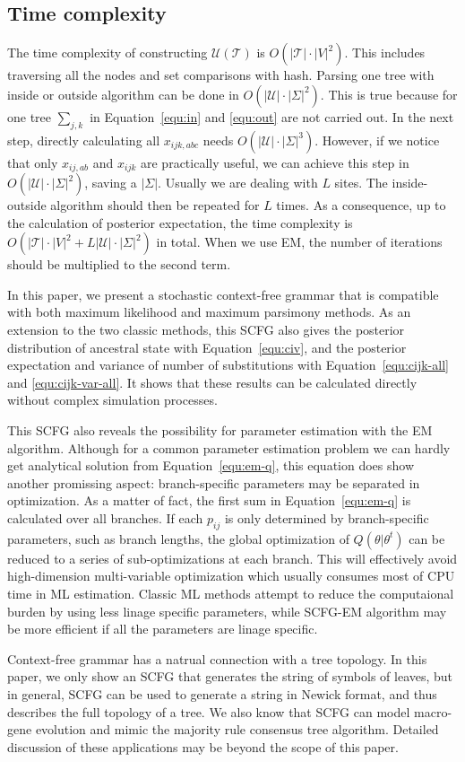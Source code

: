 \documentclass[pdftex,11pt]{article}
\begin{document}
\subsection{Time complexity}
The time complexity of constructing $\mathcal{U}(\mathcal{T})$ is
$O(|\mathcal{T}|\cdot|V|^2)$.  This includes traversing all the nodes
and set comparisons with hash. Parsing one tree with inside or outside
algorithm can be done in $O(|\mathcal{U}|\cdot|\Sigma|^2)$. This is true
because for one tree $\sum_{j,k}$ in Equation~\ref{equ:in} and
\ref{equ:out} are not carried out. In the next step, directly
calculating all $x_{ijk,abc}$ needs $O(|\mathcal{U}|\cdot|\Sigma|^3)$.
However, if we notice that only $x_{ij,ab}$ and $x_{ijk}$ are
practically useful, we can achieve this step in
$O(|\mathcal{U}|\cdot|\Sigma|^2)$, saving a $|\Sigma|$.  Usually we are
dealing with $L$ sites. The inside-outside algorithm should then be
repeated for $L$ times.  As a consequence, up to the calculation of
posterior expectation, the time complexity is
$O(|\mathcal{T}|\cdot|V|^2+L|\mathcal{U}|\cdot|\Sigma|^2)$ in
total. When we use EM, the number of iterations should be multiplied to
the second term.


In this paper, we present a stochastic context-free grammar that is
compatible with both maximum likelihood and maximum parsimony
methods. As an extension to the two classic methods, this SCFG also
gives the posterior distribution of ancestral state with
Equation~\ref{equ:civ}, and the posterior expectation and variance of
number of substitutions with Equation~\ref{equ:cijk-all} and
\ref{equ:cijk-var-all}. It shows that these results can be calculated
directly without complex simulation processes.

This SCFG also reveals the possibility for parameter estimation with the
EM algorithm.  Although for a common parameter estimation problem we can
hardly get analytical solution from Equation~\ref{equ:em-q}, this
equation does show another promissing aspect: branch-specific parameters
may be separated in optimization. As a matter of fact, the first sum in
Equation~\ref{equ:em-q} is calculated over all branches. If each
$p_{ij}$ is only determined by branch-specific parameters, such as
branch lengths, the global optimization of $Q(\theta|\theta^t)$ can be
reduced to a series of sub-optimizations at each branch. This will
effectively avoid high-dimension multi-variable optimization which
usually consumes most of CPU time in ML estimation. Classic ML methods
attempt to reduce the computaional burden by using less linage specific
parameters, while SCFG-EM algorithm may be more efficient if all the
parameters are linage specific.

Context-free grammar has a natrual connection with a tree topology. In
this paper, we only show an SCFG that generates the string of symbols of
leaves, but in general, SCFG can be used to generate a string in Newick
format, and thus describes the full topology of a tree.  We also know
that SCFG can model macro-gene evolution and mimic the majority rule
consensus tree algorithm. Detailed discussion of these applications may
be beyond the scope of this paper.


\end{document}
